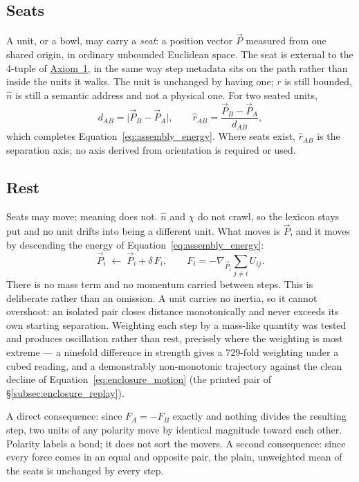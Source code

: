 \documentclass[12pt, a4paper]{article}
\begin{document}
\subsection{Seats}
\label{subsec:enclosure_seats}
A unit, or a bowl, may carry a \emph{seat}: a position vector
$\vec P$ measured from one shared origin, in ordinary unbounded
Euclidean space. The seat is external to the 4-tuple of
\hyperref[subsec:axiom1]{Axiom~1}, in the same way step metadata sits on the
path rather than inside the units it walks. The unit is unchanged by
having one; $r$ is still bounded, $\hat n$ is still a semantic
address and not a physical one. For two seated units,
\begin{equation}
    d_{AB} = \lvert \vec P_B - \vec P_A\rvert,
    \qquad
    \hat r_{AB} = \frac{\vec P_B - \vec P_A}{d_{AB}},
    \label{eq:enclosure_distance}
\end{equation}
which completes Equation~\eqref{eq:assembly_energy}. Where seats
exist, $\hat r_{AB}$ is the separation axis; no axis derived from
orientation is required or used.

\subsection{Rest}
\label{subsec:enclosure_rest}
Seats may move; meaning does not. $\hat n$ and $\chi$ do not crawl,
so the lexicon stays put and no unit drifts into being a different
unit. What moves is $\vec P$, and it moves by descending the energy
of Equation~\eqref{eq:assembly_energy}:
\begin{equation}
    \vec P_i \;\leftarrow\; \vec P_i + \delta\,F_i,
    \qquad
    F_i = -\nabla_{\vec P_i}\!\!\sum_{j\ne i} U_{ij}.
    \label{eq:enclosure_motion}
\end{equation}
There is no mass term and no momentum carried between steps. This
is deliberate rather than an omission. A unit carries no inertia, so
it cannot overshoot: an isolated pair closes distance monotonically
and never exceeds its own starting separation. Weighting each step
by a mass-like quantity was tested and produces oscillation rather
than rest, precisely where the weighting is most extreme --- a
ninefold difference in strength gives a $729$-fold weighting under a
cubed reading, and a demonstrably non-monotonic trajectory against
the clean decline of Equation~\eqref{eq:enclosure_motion}
(the printed pair of \S\ref{subsec:enclosure_replay}).

A direct consequence: since $F_A=-F_B$ exactly and nothing divides
the resulting step, two units of any polarity move by identical
magnitude toward each other. Polarity labels a bond; it does not
sort the movers. A second consequence: since every force comes in an
equal and opposite pair, the plain, unweighted mean of the seats is unchanged by every step.
\end{document}
